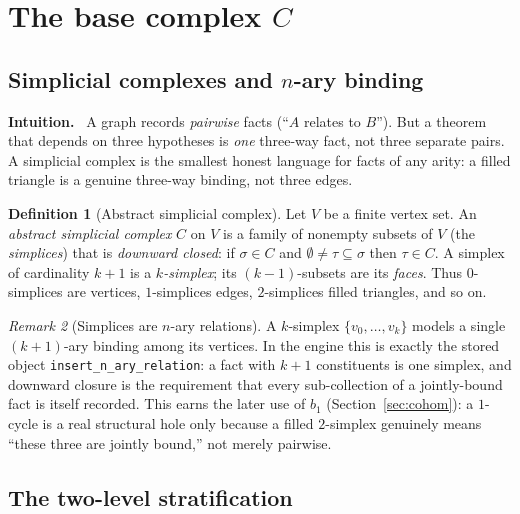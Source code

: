 \documentclass[11pt]{article}
\theoremstyle{definition}
\newtheorem{definition}{Definition}[section]
\theoremstyle{plain}
\theoremstyle{remark}
\newtheorem{remark}[definition]{Remark}
\newcommand{\Intu}{\noindent\textbf{\color{intuitioncol}Intuition.}\ }
\newcommand{\CC}{C}                 %
\begin{document}
\section{The base complex \texorpdfstring{$\CC$}{C}}\label{sec:complex}

\subsection{Simplicial complexes and \texorpdfstring{$n$}{n}-ary binding}

\begin{intu}\Intu
A graph records \emph{pairwise} facts (``$A$ relates to $B$''). But a theorem that
depends on three hypotheses is \emph{one} three-way fact, not three separate pairs.
A simplicial complex is the smallest honest language for facts of any arity: a filled
triangle is a genuine three-way binding, not three edges.
\end{intu}

\begin{definition}[Abstract simplicial complex]
Let $V$ be a finite vertex set. An \emph{abstract simplicial complex} $\CC$ on $V$ is
a family of nonempty subsets of $V$ (the \emph{simplices}) that is
\emph{downward closed}: if $\sigma\in\CC$ and $\emptyset\neq\tau\subseteq\sigma$ then
$\tau\in\CC$. A simplex of cardinality $k+1$ is a \emph{$k$-simplex}; its
$(k-1)$-subsets are its \emph{faces}. Thus $0$-simplices are vertices, $1$-simplices
edges, $2$-simplices filled triangles, and so on.
\end{definition}

\begin{remark}[Simplices are $n$-ary relations]\label{rem:nary}
A $k$-simplex $\{v_0,\dots,v_k\}$ models a single $(k{+}1)$-ary binding among its
vertices. In the engine this is exactly the stored object
\texttt{insert\_n\_ary\_relation}: a fact with $k{+}1$ constituents is one simplex,
and downward closure is the requirement that every sub-collection of a jointly-bound
fact is itself recorded. This earns the later use of $b_1$ (Section~\ref{sec:cohom}):
a $1$-cycle is a real structural hole only because a filled $2$-simplex genuinely
means ``these three are jointly bound,'' not merely pairwise.
\end{remark}

\subsection{The two-level stratification}
\end{document}
